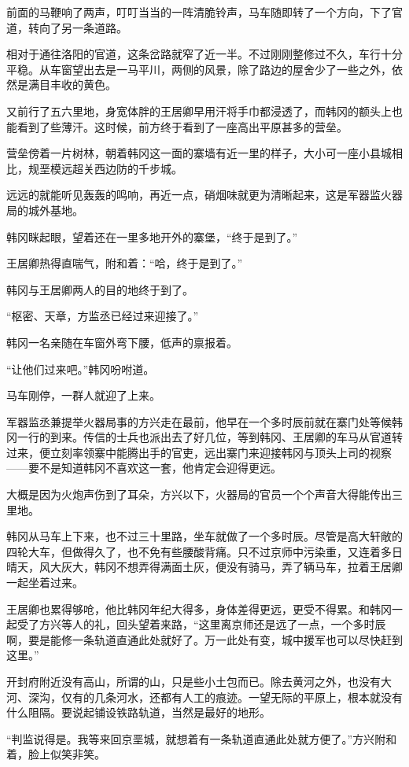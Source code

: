 前面的马鞭响了两声，叮叮当当的一阵清脆铃声，马车随即转了一个方向，下了官道，转向了另一条道路。

相对于通往洛阳的官道，这条岔路就窄了近一半。不过刚刚整修过不久，车行十分平稳。从车窗望出去是一马平川，两侧的风景，除了路边的屋舍少了一些之外，依然是满目丰收的黄色。

又前行了五六里地，身宽体胖的王居卿早用汗将手巾都浸透了，而韩冈的额头上也能看到了些薄汗。这时候，前方终于看到了一座高出平原甚多的营垒。

营垒傍着一片树林，朝着韩冈这一面的寨墙有近一里的样子，大小可一座小县城相比，规垩模远超关西边防的千步城。

远远的就能听见轰轰的鸣响，再近一点，硝烟味就更为清晰起来，这是军器监火器局的城外基地。

韩冈眯起眼，望着还在一里多地开外的寨堡，“终于是到了。”

王居卿热得直喘气，附和着：“哈，终于是到了。”

韩冈与王居卿两人的目的地终于到了。

“枢密、天章，方监丞已经过来迎接了。”

韩冈一名亲随在车窗外弯下腰，低声的禀报着。

“让他们过来吧。”韩冈吩咐道。

马车刚停，一群人就迎了上来。

军器监丞兼提举火器局事的方兴走在最前，他早在一个多时辰前就在寨门处等候韩冈一行的到来。传信的士兵也派出去了好几位，等到韩冈、王居卿的车马从官道转过来，便立刻率领寨中能腾出手的官吏，远出寨门来迎接韩冈与顶头上司的视察——要不是知道韩冈不喜欢这一套，他肯定会迎得更远。

大概是因为火炮声伤到了耳朵，方兴以下，火器局的官员一个个声音大得能传出三里地。

韩冈从马车上下来，也不过三十里路，坐车就做了一个多时辰。尽管是高大轩敞的四轮大车，但做得久了，也不免有些腰酸背痛。只不过京师中污染重，又连着多日晴天，风大灰大，韩冈不想弄得满面土灰，便没有骑马，弄了辆马车，拉着王居卿一起坐着过来。

王居卿也累得够呛，他比韩冈年纪大得多，身体差得更远，更受不得累。和韩冈一起受了方兴等人的礼，回头望着来路，“这里离京师还是远了一点，一个多时辰啊，要是能修一条轨道直通此处就好了。万一此处有变，城中援军也可以尽快赶到这里。”

开封府附近没有高山，所谓的山，只是些小土包而已。除去黄河之外，也没有大河、深沟，仅有的几条河水，还都有人工的痕迹。一望无际的平原上，根本就没有什么阻隔。要说起铺设铁路轨道，当然是最好的地形。

“判监说得是。我等来回京垩城，就想着有一条轨道直通此处就方便了。”方兴附和着，脸上似笑非笑。

